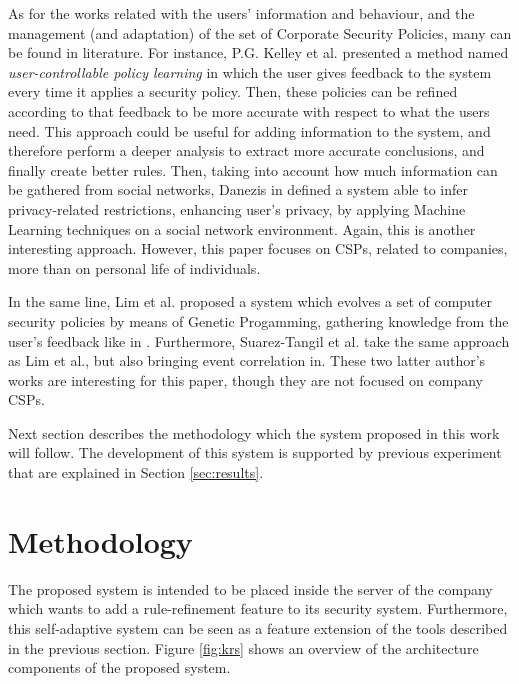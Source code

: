 \documentclass{sig-alternate}
\begin{document}
As for the works related with the users' information and behaviour, and the management (and adaptation) of the set of Corporate Security Policies, many can be found in literature. For instance, P.G. Kelley et al. \cite{user-controllable_learning_08} presented a method named \textit{user-controllable policy learning} in which the user gives feedback to the system every time it applies a security policy. Then, these policies can be refined according to that feedback to be more accurate with respect to what the users need. This approach could be useful for adding information to the system, and therefore perform a deeper analysis to extract more accurate conclusions, and finally create better rules.
Then, taking into account how much information can be gathered from social networks, Danezis in \cite{inferring_policies_socialnetworks_09} defined a system able to infer privacy-related restrictions, enhancing user's privacy, by applying Machine Learning techniques on a social network environment. Again, this is another interesting approach. However, this paper focuses on CSPs, related to companies, more than on personal life of individuals.

In the same line, Lim et al. proposed a system \cite{lim2008mls, lim2008policy} which evolves a set of computer security policies by means of Genetic Progamming, gathering knowledge from the user's feedback like in \cite{user-controllable_learning_08}. Furthermore, Suarez-Tangil et al. \cite{suarez2009automatic} take the same approach as Lim et al., but also bringing event correlation in. These two latter author's works are interesting for this paper, though they are not focused on company CSPs.

Next section describes the methodology which the system proposed in this work will follow. The development of this system is supported by previous experiment that are explained in Section \ref{sec:results}.

%
%
\section{Methodology}
\label{sec:methodology}

The proposed system is intended to be placed inside the server of the company which wants to add a rule-refinement feature to its security system. Furthermore, this self-adaptive system can be seen as a feature extension of the tools described in the previous section. Figure \ref{fig:krs} shows an overview of the architecture components of the proposed system.
\end{document}
